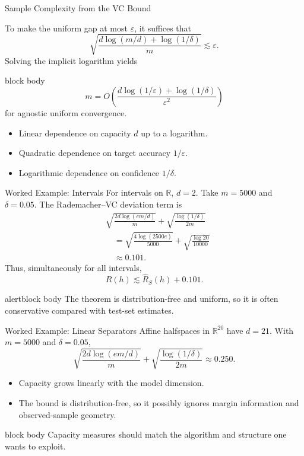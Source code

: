 \documentclass[aspectratio=169,10pt]{beamer}
\newcommand{\Rhat}{\widehat{R}_S}
\newcommand{\eps}{\varepsilon}
\newcommand{\KeyBox}[1]{%
  \begin{beamercolorbox}[rounded=true,sep=0.22cm,wd=\linewidth]{block body}
    #1
  \end{beamercolorbox}%
}
\newcommand{\OrangeBox}[1]{%
  \begin{beamercolorbox}[rounded=true,sep=0.22cm,wd=\linewidth]{alertblock body}
    #1
  \end{beamercolorbox}%
}
\begin{document}
\begin{frame}[t]{Sample Complexity from the VC Bound}
  \vspace{-0.04cm}
  {\footnotesize
  To make the uniform gap at most $\eps$, it suffices that
  \[
    \sqrt{\frac{d\log(m/d)+\log(1/\delta)}{m}}
    \lesssim\eps.
  \]
  Solving the implicit logarithm yields
  \begin{beamercolorbox}[rounded=true,sep=0.10cm,wd=\linewidth]{block body}
    \[
      \boxed{
      m=O\!\left(
        \frac{d\log(1/\eps)+\log(1/\delta)}{\eps^2}
      \right)}
    \]
    for agnostic uniform convergence.
  \end{beamercolorbox}
  \vspace{0.02cm}
  \begin{itemize}
    \setlength{\itemsep}{0.03cm}
    \item Linear dependence on capacity $d$ up to a logarithm.
    \item Quadratic dependence on target accuracy $1/\eps$.
    \item Logarithmic dependence on confidence $1/\delta$.
  \end{itemize}}
\end{frame}

\begin{frame}[t]{Worked Example: Intervals}
  \vspace{0.01cm}
  For intervals on $\mathbb{R}$, $d=2$. Take $m=5000$ and $\delta=0.05$. The Rademacher--VC deviation term is
  \begin{align*}
    &\sqrt{\frac{2d\log(em/d)}{m}}
      +\sqrt{\frac{\log(1/\delta)}{2m}}\\
    &\quad=\sqrt{\frac{4\log(2500e)}{5000}}
      +\sqrt{\frac{\log 20}{10000}}\\
    &\quad\approx 0.101.
  \end{align*}
  Thus, simultaneously for all intervals,
  \[
    R(h)\lesssim \Rhat(h)+0.101.
  \]
  \vspace{0.04cm}
  \OrangeBox{The theorem is distribution-free and uniform, so it is often conservative compared with test-set estimates.}
\end{frame}

\begin{frame}[t]{Worked Example: Linear Separators}
  \vspace{0.01cm}
  Affine halfspaces in $\mathbb{R}^{20}$ have $d=21$. With $m=5000$ and $\delta=0.05$,
  \[
    \sqrt{\frac{2d\log(em/d)}{m}}
    +\sqrt{\frac{\log(1/\delta)}{2m}}
    \approx 0.250.
  \]
  \begin{itemize}
    \setlength{\itemsep}{0.12cm}
    \item Capacity grows linearly with the model dimension.
    \item The bound is distribution-free, so it possibly ignores margin information and observed-sample geometry.
  \end{itemize}
  \vspace{0.06cm}
  \KeyBox{Capacity measures should match the algorithm and structure one wants to exploit.}
\end{frame}
\end{document}
